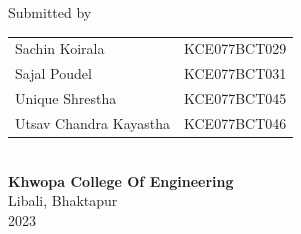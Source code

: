 \begin{center}
    \vspace{0.2in}
    \large{Submitted by}\\
    \vspace{0.1in}
    \begin{tabular}{p{3.5in}p{2in}}
        \hspace{0.3cm}Sachin Koirala& \hspace{1cm}KCE077BCT029\\
        \hspace{0.3cm}Sajal Poudel& \hspace{1cm}KCE077BCT031\\
        \hspace{0.3cm}Unique Shrestha& \hspace{1cm}KCE077BCT045\\
        \hspace{0.3cm}Utsav Chandra Kayastha& \hspace{1cm}KCE077BCT046\\
    \end{tabular}
    \\
    \vspace{1cm}
        \vspace{0.8cm}
    \large{\textbf{Khwopa College Of Engineering}\\}
        \normalsize{Libali, Bhaktapur\\
        2023
    }
\end{center}
